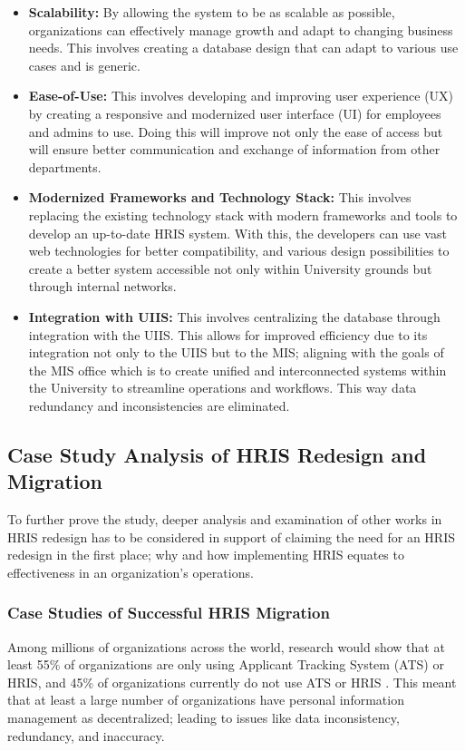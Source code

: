         \begin{itemize}
            \item[] \textbf{Scalability:} By allowing the system to be as scalable as possible, organizations can effectively manage growth and adapt to changing business needs. This involves creating a database design that can adapt to various use cases and is generic. 
            \item[] \textbf{Ease-of-Use:} This involves developing and improving user experience (UX) by creating a responsive and modernized user interface (UI) for employees and admins to use. Doing this will improve not only the ease of access but will ensure better communication and exchange of information from other departments.
            \item[] \textbf{Modernized Frameworks and Technology Stack:} This involves replacing the existing technology stack with modern frameworks and tools to develop an up-to-date HRIS system. With this, the developers can use vast web technologies for better compatibility, and various design possibilities to create a better system accessible not only within University grounds but through internal networks.
            \item[] \textbf{Integration with UIIS:} This involves centralizing the database through integration with the UIIS. This allows for improved efficiency due to its integration not only to the UIIS but to the MIS; aligning with the goals of the MIS office which is to create unified and interconnected systems within the University to streamline operations and workflows. This way data redundancy and inconsistencies are eliminated.
        \end{itemize}
    
    \subsection{Case Study Analysis of HRIS Redesign and Migration}
    To further prove the study, deeper analysis and examination of other works in HRIS redesign has to be considered in support of claiming the need for an HRIS redesign in the first place; why and how implementing HRIS equates to effectiveness in an organization's operations.
    
        \subsubsection{Case Studies of Successful HRIS Migration}
        Among millions of organizations across the world, research would show that at least 55\% of organizations are only using Applicant Tracking System (ATS) or HRIS, and 45\% of organizations currently do not use ATS or HRIS \cite{ms12019}. This meant that at least a large number of organizations have personal information management as decentralized; leading to issues like data inconsistency, redundancy, and inaccuracy.

